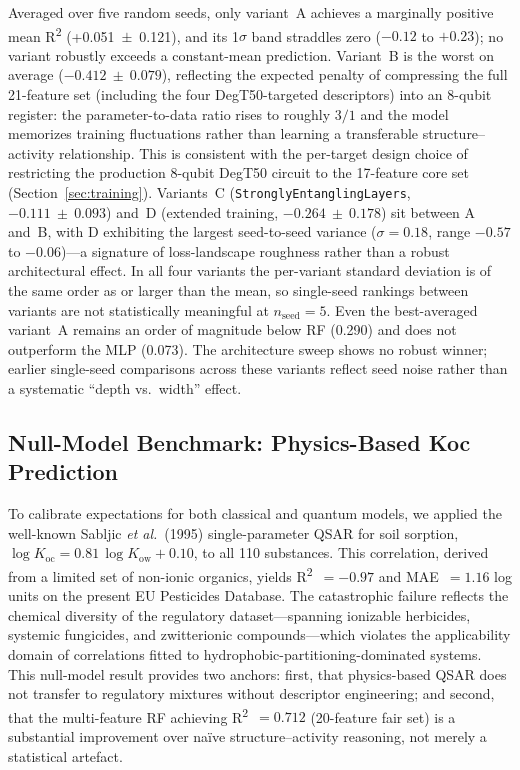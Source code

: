 \documentclass[12pt,a4paper]{article}
\newcommand{\degtl}{DegT50}
\newcommand{\rtwo}{R\textsuperscript{2}}
\newcommand{\nsub}{110}
\begin{document}
Averaged over five random seeds, only variant~A achieves a marginally
positive mean \rtwo{} (+0.051~$\pm$~0.121), and its 1$\sigma$ band
straddles zero ($-0.12$ to $+0.23$); no variant robustly exceeds a
constant-mean prediction. Variant~B is the worst on average
($-0.412~\pm~0.079$), reflecting the expected penalty of compressing the
full 21-feature set (including the four DegT50-targeted descriptors) into
an 8-qubit register: the parameter-to-data ratio rises to roughly $3/1$
and the model memorizes training fluctuations rather than learning a
transferable structure--activity relationship. This is consistent with
the per-target design choice of restricting the production 8-qubit
\degtl{} circuit to the 17-feature core set
(Section~\ref{sec:training}). Variants~C (\texttt{StronglyEntanglingLayers},
$-0.111~\pm~0.093$) and~D (extended training, $-0.264~\pm~0.178$) sit
between A and~B, with D exhibiting the largest seed-to-seed variance
($\sigma = 0.18$, range $-0.57$ to $-0.06$)---a signature of
loss-landscape roughness rather than a robust architectural effect. In
all four variants the per-variant standard deviation is of the same order
as or larger than the mean, so single-seed rankings between variants are
not statistically meaningful at $n_\text{seed} = 5$. Even the
best-averaged variant~A remains an order of magnitude below RF (0.290)
and does not outperform the MLP (0.073). The architecture sweep shows
no robust winner; earlier single-seed comparisons across these variants
reflect seed noise rather than a systematic ``depth vs.\ width'' effect.

\subsection{Null-Model Benchmark: Physics-Based Koc Prediction}

To calibrate expectations for both classical and quantum models, we applied
the well-known Sabljic \emph{et al.}\ (1995) single-parameter QSAR for
soil sorption,
$\log K_\text{oc} = 0.81\,\log K_\text{ow} + 0.10$,
to all \nsub{} substances. This correlation, derived from a limited set of
non-ionic organics, yields \rtwo{}~$= -0.97$ and MAE~$= 1.16$ log units
on the present EU Pesticides Database. The catastrophic failure reflects
the chemical diversity of the regulatory dataset---spanning ionizable
herbicides, systemic fungicides, and zwitterionic compounds---which violates
the applicability domain of correlations fitted to
hydrophobic-partitioning-dominated systems. This null-model result provides
two anchors: first, that physics-based QSAR does not transfer to regulatory
mixtures without descriptor engineering; and second, that the multi-feature
RF achieving \rtwo{}~$= 0.712$ (20-feature fair set) is a
substantial improvement over na\"ive structure--activity reasoning,
not merely a statistical artefact.
\end{document}
